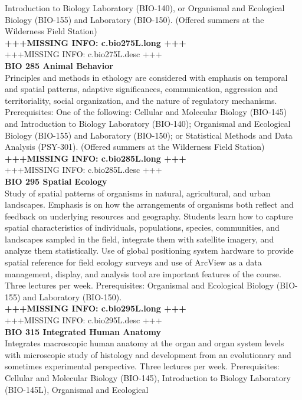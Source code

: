 \documentclass[
  letterpaper,
]{scrbook}
\begin{document}
Introduction to Biology Laboratory (BIO-140), or Organismal and
Ecological Biology (BIO-155) and Laboratory (BIO-150). (Offered summers
at the Wilderness Field Station)\\
\textbf{+++MISSING INFO: c.bio275L.long +++}\\
+++MISSING INFO: c.bio275L.desc +++\\
\textbf{BIO 285 Animal Behavior}\\
Principles and methods in ethology are considered with emphasis on
temporal and spatial patterns, adaptive significances, communication,
aggression and territoriality, social organization, and the nature of
regulatory mechanisms. Prerequisites: One of the following: Cellular and
Molecular Biology (BIO-145) and Introduction to Biology Laboratory
(BIO-140); Organismal and Ecological Biology (BIO-155) and Laboratory
(BIO-150); or Statistical Methods and Data Analysis (PSY-301). (Offered
summers at the Wilderness Field Station)\\
\textbf{+++MISSING INFO: c.bio285L.long +++}\\
+++MISSING INFO: c.bio285L.desc +++\\
\textbf{BIO 295 Spatial Ecology}\\
Study of spatial patterns of organisms in natural, agricultural, and
urban landscapes. Emphasis is on how the arrangements of organisms both
reflect and feedback on underlying resources and geography. Students
learn how to capture spatial characteristics of individuals,
populations, species, communities, and landscapes sampled in the field,
integrate them with satellite imagery, and analyze them statistically.
Use of global positioning system hardware to provide spatial reference
for field ecology surveys and use of ArcView as a data management,
display, and analysis tool are important features of the course. Three
lectures per week. Prerequisites: Organismal and Ecological Biology
(BIO-155) and Laboratory (BIO-150).\\
\textbf{+++MISSING INFO: c.bio295L.long +++}\\
+++MISSING INFO: c.bio295L.desc +++\\
\textbf{BIO 315 Integrated Human Anatomy}\\
Integrates macroscopic human anatomy at the organ and organ system
levels with microscopic study of histology and development from an
evolutionary and sometimes experimental perspective. Three lectures per
week. Prerequisites: Cellular and Molecular Biology (BIO-145),
Introduction to Biology Laboratory (BIO-145L), Organismal and Ecological
\end{document}
